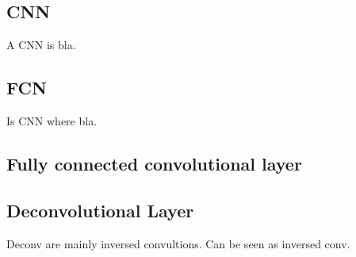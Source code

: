 \subsection{CNN}
A CNN is bla.

\subsection{FCN}
Is CNN where bla.

\subsection{Fully connected convolutional layer}

\subsection{Deconvolutional Layer}
Deconv are mainly inversed convultions. Can be seen as inversed conv.
